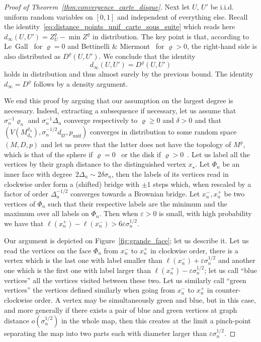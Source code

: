 \documentclass[AHL,Unicode,longabstracts,published]{cedram}
\newcommand{\1}{\ensembles{1}}
\renewcommand{\ge}{\geqslant}
\newcommand{\Bmap}{M}
\newcommand{\dBmap}{D}
\newcommand{\mn}{M_{d_n}^{\varrho_n}}
\newcommand{\dgr}{d_{\mathrm{gr}}}
\newcommand{\pgr}{p_{\mathrm{unif}}}
\begin{document}
\begin{proof}[Proof of Theorem~\ref{thm:convergence_carte_disque}]
Next let $U$, $U'$ be i.i.d. uniform random variables on $[0,1]$ and independent of everything else. Recall the identity~\eqref{eq:distance_points_unif_carte_sous_suite} which reads here $d_\infty(U,U') = Z^\varrho_U - \min Z^\varrho$ in distribution. The key point is that, according to Le~Gall~\cite[Corollary~7.3]{LG13} for $\varrho = 0$ and Bettinelli \& Miermont~\cite[Lemma~17 \& Corollary~21]{BM17} for $\varrho > 0$, the right-hand side is also distributed as $\dBmap^\varrho(U,U')$. We conclude that the identity
\[
d_\infty(U,U') = \dBmap^\varrho(U,U')
\]
holds in distribution and thus almost surely by the previous bound. The identity $d_\infty = \dBmap^\varrho$ follows by a density argument.



We end this proof by arguing that our assumption on the largest degree is necessary. Indeed, extracting a subsequence if necessary, let us assume that $\sigma_n^{-1} \varrho_n$ and $\sigma_n^{-1} \Delta_n$ converge respectively to $\varrho \ge 0$ and $\delta > 0$ and that $(V(\mn), \sigma_n^{-1/2} \dgr, \pgr)$ converges in distribution to some random space $(M, D, p)$ and let us prove that the latter does not have the topology of $\Bmap^\varrho$, which is that of the sphere if $\varrho = 0$~\cite{LGP08, Mie08} or the disk if $\varrho > 0$~\cite{Bet15}. Let us label all the vertices by their graph distance to the distinguished vertex $x_\star$. Let $\Phi_n$ be an inner face with degree~$2\Delta_n \sim 2 \delta \sigma_n$, then the labels of its vertices read in clockwise order form a (shifted) bridge with $\pm1$ steps which, when rescaled by a factor of order $\Delta_n^{-1/2}$ converges towards a Brownian bridge. Let $x_n^-, x_n^+$ be two vertices of $\Phi_n$ such that their respective labels are the minimum and the maximum over all labels on $\Phi_n$. Then when $\varepsilon > 0$ is small, with high probability we have that $\ell(x_n^+) - \ell(x_n^-) > 6 \varepsilon \sigma_n^{1/2}$.


Our argument is depicted on Figure~\ref{fig:grande_face}; let us describe it. Let us read the vertices on the face $\Phi_n$ from $x_n^-$ to $x_n^+$ in clockwise order, there is a vertex which is the last one with label smaller than $\ell(x_n^-) + \varepsilon \sigma_n^{1/2}$ and another one which is the first one with label larger than $\ell(x_n^+) - \varepsilon \sigma_n^{1/2}$; let us call ``blue vertices'' all the vertices visited between these two. Let us similarly call ``green vertices'' the vertices defined similarly when going from $x_n^-$ to $x_n^+$ in counter-clockwise order. A vertex may be simultaneously green and blue, but in this case, and more generally if there exists a pair of blue and green vertices at graph distance $o(\sigma_n^{1/2})$ in the whole map, then this creates at the limit a pinch-point separating the map into two parts each with diameter larger than $\varepsilon \sigma_n^{1/2}$.



\end{proof}
\end{document}
